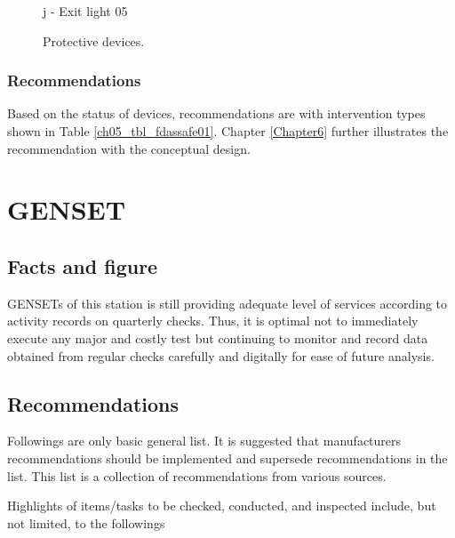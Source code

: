 \begin{figure}[!htb]
\begin{minipage}[b]{0.22\linewidth}
	\caption*{j - Exit light 05}
\end{minipage}
	\caption{Protective devices.}
	\label{ch05_fig_fdassafety01}
\end{figure}

\subsubsection{Recommendations}
Based on the status of devices, recommendations are with intervention types shown in Table \ref{ch05_tbl_fdassafe01}. Chapter \ref{Chapter6} further illustrates the recommendation with the conceptual design.

\section{GENSET} \label{ch04genset}
\subsection{Facts and figure}
GENSETs of this station is still providing adequate level of services according to activity records on quarterly checks. Thus, it is optimal not to immediately execute any major and costly test but continuing to monitor and record data obtained from regular checks carefully and digitally for ease of future analysis.

\subsection{Recommendations}
Followings are only basic general list. It is suggested that manufacturers recommendations should be implemented and supersede recommendations in the list. This list is a collection of recommendations from various sources.

Highlights of items/tasks to be checked, conducted, and inspected include, but not limited, to the followings
